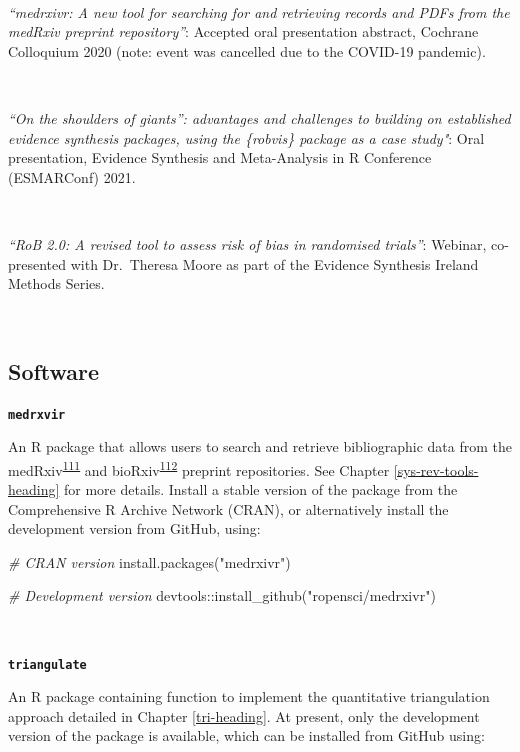 \documentclass[a4paper, twoside]{templates/ociamthesis}
\newenvironment{Shaded}{\begin{snugshade}}{\end{snugshade}}
\newcommand{\CommentTok}[1]{\textcolor[rgb]{0.56,0.35,0.01}{\textit{#1}}}
\newcommand{\FunctionTok}[1]{\textcolor[rgb]{0.00,0.00,0.00}{#1}}
\newcommand{\NormalTok}[1]{#1}
\newcommand{\SpecialCharTok}[1]{\textcolor[rgb]{0.00,0.00,0.00}{#1}}
\newcommand{\StringTok}[1]{\textcolor[rgb]{0.31,0.60,0.02}{#1}}
\renewenvironment{Shaded}
{
  \vspace{4pt}%
  \begin{snugshade}%
}{%
  \end{snugshade}%
  \vspace{4pt}%
}
\begin{document}
~

\emph{``medrxivr: A new tool for searching for and retrieving records and PDFs from the medRxiv preprint repository''}: Accepted oral presentation abstract, Cochrane Colloquium 2020 (note: event was cancelled due to the COVID-19 pandemic).

~

\emph{``On the shoulders of giants'': advantages and challenges to building on established evidence synthesis packages, using the \{robvis\} package as a case study"}: Oral presentation, Evidence Synthesis and Meta-Analysis in R Conference (ESMARConf) 2021.

~

\emph{``RoB 2.0: A revised tool to assess risk of bias in randomised trials''}: Webinar, co-presented with Dr.~Theresa Moore as part of the Evidence Synthesis Ireland Methods Series.

~

\hypertarget{outputs-software}{%
\subsection{Software}\label{outputs-software}}

\textbf{\texttt{medrxvir}}

An R package that allows users to search and retrieve bibliographic data from the medRxiv\textsuperscript{\protect\hyperlink{ref-rawlinson2019}{111}} and bioRxiv\textsuperscript{\protect\hyperlink{ref-sever2019}{112}} preprint repositories. See Chapter \ref{sys-rev-tools-heading} for more details. Install a stable version of the package from the Comprehensive R Archive Network (CRAN), or alternatively install the development version from GitHub, using:

\begin{Shaded}
\begin{Highlighting}[]
\CommentTok{\# CRAN version}
\FunctionTok{install.packages}\NormalTok{(}\StringTok{"medrxivr"}\NormalTok{)}

\CommentTok{\# Development version}
\NormalTok{devtools}\SpecialCharTok{::}\FunctionTok{install\_github}\NormalTok{(}\StringTok{"ropensci/medrxivr"}\NormalTok{)}
\end{Highlighting}
\end{Shaded}

~

\textbf{\texttt{triangulate}}

An R package containing function to implement the quantitative triangulation approach detailed in Chapter \ref{tri-heading}. At present, only the development version of the package is available, which can be installed from GitHub using:
\end{document}
